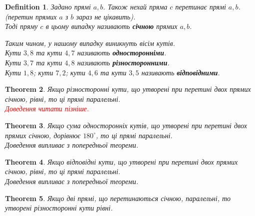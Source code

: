 \documentclass[a4paper, 10pt]{article}
\theoremstyle{theoremdd}
\newtheorem{theorem}{Theorem}[subsection]
\theoremstyle{theoremdd}
\theoremstyle{theoremdd}
\newtheorem{definition}[theorem]{Definition}
\theoremstyle{theoremdd}
\theoremstyle{theoremdd}
\theoremstyle{theoremdd}
\theoremstyle{theoremdd}
\theoremstyle{theoremdd}
\theoremstyle{theoremdd}
\begin{document}
\begin{definition}
Задано прямі $a,b$. Також нехай пряма $c$ перетинає прямі $a,b$. (перетин прямих $a$ з $b$ зараз не цікавить).\\
Тоді пряму $c$ в цьому випадку називають \textbf{січною} прямих $a,b$.
\begin{figure}[H]
\centering
{}
\end{figure}
Таким чином, у нашому випадку виникнуть вісім кутів.\\
Кути $3,8$ та кути $4,7$ називають \textbf{односторонніми}.\\
Кути $3,7$ та кути $4,8$ називають \textbf{різносторонними}.\\
Кути $1,8$; кути $7,2$; кути $4,6$ та кути $3,5$ називають \textbf{відповідними}.
\end{definition}

\begin{theorem}
\label{versatile angles_and_parallel_lines}
Якщо різносторонні кути, що утворені при перетині двох прямих січною, рівні, то ці прямі паралельні.\\
\textcolor{red}{\textit{Доведення читати пізніше.}}
\end{theorem}

\begin{theorem}
Якщо сума односторонніх кутів, що утворені при перетині двох прямих січною, дорівнює $180^\circ$, то ці прямі паралельні.\\
\textit{Доведення випливає з попередньої теореми.}
\end{theorem}

\begin{theorem}
Якщо відповідні кути, що утворені при перетині двох прямих січною, рівні, то ці прямі паралельні.\\
\textit{Доведення випливає з попередньої теореми.}
\end{theorem}

\begin{theorem}
Якщо дві прямі, що перетинаються січною, паралельні, то утворені різносторонні кути рівні.
\end{theorem}
\end{document}
